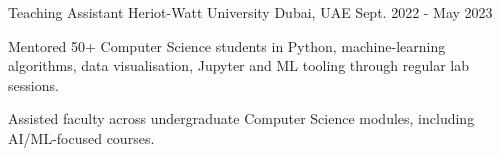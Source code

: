 \begin{cventries}
	\cventry
	{Teaching Assistant} %
	{Heriot-Watt University} %
	{Dubai, UAE} %
	{Sept. 2022 - May 2023} %
	{
		\begin{cvitems}
			\item Mentored 50+ Computer Science students in Python, machine-learning algorithms, data visualisation, Jupyter and ML tooling through regular lab sessions.
			\item Assisted faculty across undergraduate Computer Science modules, including AI/ML-focused courses.
		\end{cvitems}
	}
	
	
	
\end{cventries}
